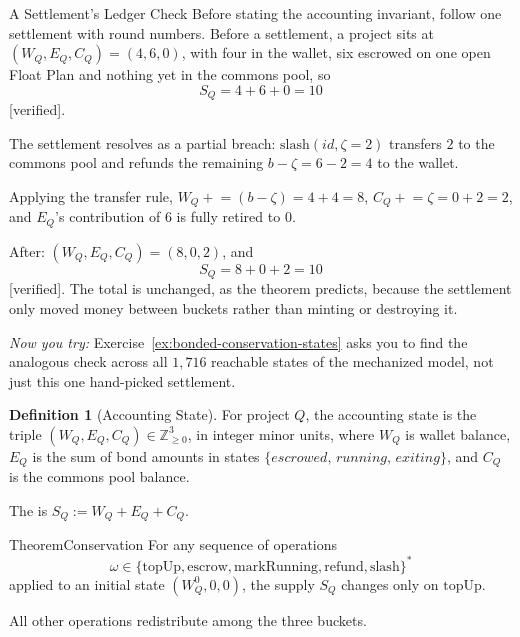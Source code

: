 \documentclass[11pt,a4paper]{article}
\theoremstyle{definition}
\newtheorem{definition}{Definition}[section]
\theoremstyle{remark}
\begin{document}
\begin{pdexample}{A Settlement's Ledger Check}
\setlength{\parskip}{4pt plus 1pt}
Before stating the accounting invariant, follow one settlement with round numbers. Before a settlement, a project sits at $(W_Q, E_Q, C_Q) = (4, 6, 0)$, with four in the wallet, six escrowed on one open Float Plan and nothing yet in the commons pool, so \[
S_Q = 4+6+0=10
\] [verified].

The settlement resolves as a partial breach: $\mathrm{slash}(\mathit{id}, \zeta{=}2)$ transfers $2$ to the commons pool and refunds the remaining $b-\zeta=6-2=4$ to the wallet.

Applying the transfer rule, $W_Q \mathrel{+}= (b-\zeta) = 4+4=8$, $C_Q \mathrel{+}= \zeta = 0+2=2$, and $E_Q$'s contribution of $6$ is fully retired to $0$.

After: $(W_Q, E_Q, C_Q)=(8,0,2)$, and \[
S_Q=8+0+2=10
\] [verified]. The total is unchanged, as the theorem predicts, because the settlement only moved money between buckets rather than minting or destroying it.

\emph{Now you try:} Exercise~\ref{ex:bonded-conservation-states} asks you to find the analogous check across all $1{,}716$ reachable states of the mechanized model, not just this one hand-picked settlement.
\end{pdexample}

\begin{definition}[Accounting State]\label{def:acct-state}
\setlength{\parskip}{4pt plus 1pt}
For project $Q$, the accounting state is the triple $(W_Q, E_Q, C_Q) \in \mathbb{Z}_{\geq 0}^{3}$, in integer minor units, where $W_Q$ is wallet balance, $E_Q$ is the sum of bond amounts in states $\{\textit{escrowed},\, \textit{running},\, \textit{exiting}\}$, and $C_Q$ is the commons pool balance.

The  is $S_Q := W_Q + E_Q + C_Q$.
\end{definition}

\begin{pdclaim}{Theorem}{Conservation}
\setlength{\parskip}{4pt plus 1pt}
\label{thm:conservation}
For any sequence of operations
\[
\omega \in \bigl\{\mathrm{topUp},\mathrm{escrow},\mathrm{markRunning},
\mathrm{refund},\mathrm{slash}\bigr\}^{*}
\]
applied to an initial state $(W_Q^{0}, 0, 0)$, the supply $S_Q$ changes only on $\mathrm{topUp}$.

All other operations redistribute among the three buckets.
\end{pdclaim}
\end{document}
